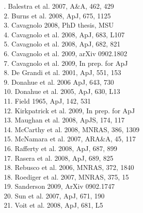 \documentclass[letterpaper,11pt]{article}
\begin{document}
\large
\begin{center}
\end{center}
\normalsize
{}. Balestra et al. 2007, A\&A, 462, 429\\
2. Burns et al. 2008, ApJ, 675, 1125\\
3. Cavagnolo 2008, PhD thesis, MSU\\
4. Cavagnolo et al. 2008, ApJ, 683, L107\\
5. Cavagnolo et al. 2008, ApJ, 682, 821\\
6. Cavagnolo et al. 2009, arXiv 0902.1802\\
7. Cavagnolo et al. 2009, In prep. for ApJ\\
8. De Grandi et al. 2001, ApJ, 551, 153\\
9. Donahue et al. 2006 ApJ, 643, 730\\
10. Donahue et al. 2005, ApJ, 630, L13\\
11. Field 1965, ApJ, 142, 531\\
12. Kirkpatrick et al. 2009, In prep. for ApJ\\
13. Maughan et al. 2008, ApJS, 174, 117\\
14. McCarthy et al. 2008, MNRAS, 386, 1309\\
15. McNamara et al. 2007, ARA\&A, 45, 117\\
16. Rafferty et al. 2008, ApJ, 687, 899\\
17. Rasera et al. 2008, ApJ, 689, 825\\
18. Rebusco et al. 2006, MNRAS, 372, 1840\\
18. Roediger et al. 2007, MNRAS, 375, 15\\
19. Sanderson 2009, ArXiv 0902.1747\\
20. Sun et al. 2007, ApJ, 671, 190\\
21. Voit et al. 2008, ApJ, 681, L5
\end{document}
